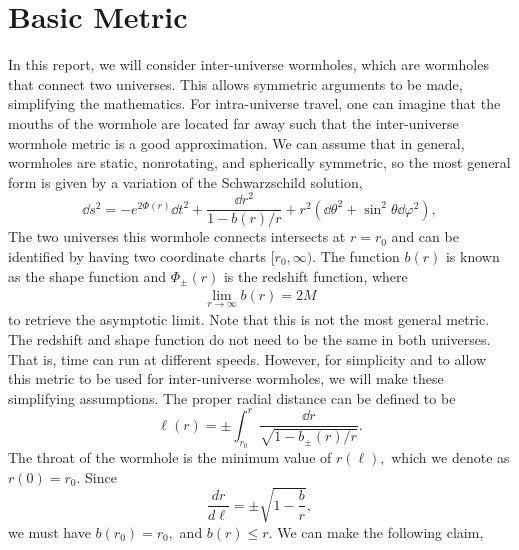 \documentclass[%
 reprint,
 amsmath,amssymb
 aps,
]{revtex4}
\theoremstyle{remark}
\begin{document}
\section{Basic Metric}
In this report, we will consider inter-universe wormholes, which are wormholes that connect two universes. This allows symmetric arguments to be made, simplifying the mathematics. For intra-universe travel, one can imagine that the mouths of the wormhole are located far away such that the inter-universe wormhole metric is a good approximation. We can assume that in general, wormholes are static, nonrotating, and spherically symmetric, so the most general form is given by a variation of the Schwarzschild solution,\cite{Thorne}
\begin{equation}
    \dd{s}^2 = -e^{2\Phi(r)}\dd{t}^2 + \frac{\dd{r}^2}{1-b(r)/r} + r^2\left(\dd{\theta}^2 + \sin^2\theta\dd{\varphi}^2\right),
\end{equation} 
The two universes this wormhole connects intersects at $r=r_0$ and can be identified by having two coordinate charts $[r_0,\infty).$ The function $b(r)$ is known as the shape function and $\Phi_{\pm}(r)$ is the redshift function, where
\begin{align}
    \lim_{r\to\infty}b(r) = 2M
\end{align}
to retrieve the asymptotic limit. Note that this is not the most general metric. The redshift and shape function do not need to be the same in both universes. That is, time can run at different speeds\cite{Visser}. However, for simplicity and to allow this metric to be used for inter-universe wormholes, we will make these simplifying assumptions. The proper radial distance can be defined to be 
\begin{equation}
    \ell(r) = \pm \int_{r_0}^{r} \frac{\dd{r}}{\sqrt{1-b_{\pm}(r)/r}}.
\end{equation}
The throat of the wormhole is the minimum value of $r(\ell),$ which we denote as $r(0)=r_0.$ Since
\begin{equation}
    \frac{dr}{d\ell} = \pm \sqrt{1-\frac{b}{r}},
\end{equation}
we must have $b(r_0)=r_0,$ and $b(r) \le r.$ We can make the following claim,
\end{document}
